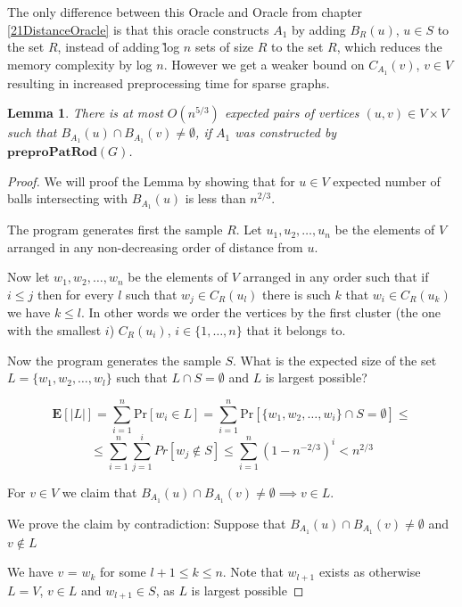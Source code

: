 \documentclass[shortabstract, lic, english]{iithesis}
\theoremstyle{definition} \newtheorem{definition}{Definition}[chapter]
\theoremstyle{remark} \newtheorem{remark}[definition]{Observation}
\theoremstyle{plain} \newtheorem{theorem}[definition]{Theorem}
\theoremstyle{plain} \newtheorem{lemma}[definition]{Lemma}
\theoremstyle{plain} \newtheorem{conjecture}[definition]{Conjecture}
\begin{document}
The only difference between this Oracle and Oracle from chapter \ref{21DistanceOracle} is that this oracle
constructs $A_1$ by adding $B_R(u)$, $u \in S$ to the set $R$, instead of adding \~log $n$ sets of size $R$ to the set $R$, which reduces the memory complexity by log $n$.
However we get a weaker bound on $C_{A_1}(v)$, $v \in V$ resulting in increased preprocessing time for sparse graphs.

\begin{lemma} \label{patRodBallIntersections}
    There is at most $O(n^{5/3})$ expected pairs of vertices $(u, v) \in V \times V$
    such that $B_{A_1}(u) \cap B_{A_1}(v) \neq \emptyset$,
    if $A_1$ was constructed by $\mathbf{preproPatRod}(G)$.
\end{lemma}

\begin{proof}
    We will proof the Lemma by showing that for $u \in V$ expected number of balls intersecting with $B_{A_1}(u)$ is less than $n^{2/3}$.

    The program generates first the sample $R$.
    Let $u_1, u_2, \ldots, u_n$ be the elements of $V$ arranged in any non-decreasing order of distance from $u$.

    Now let $w_1, w_2, \ldots, w_n$ be the elements of $V$ arranged in any order such that if $i \leq j$ then 
    for every $l$ such that $w_j \in C_R(u_l)$ there is such $k$ that $w_i \in C_R(u_k)$ we have $k \leq l$.
    In other words we order the vertices by the first cluster (the one with the smallest $i$) $C_R(u_i)$, $i \in \{1, \ldots, n\}$ that it belongs to.

    Now the program generates the sample $S$. What is the expected size of the set $L = \{w_1, w_2, \ldots, w_l\}$ such that $L \cap S = \emptyset$ and $L$ is largest possible?

    $$\mathbf{E}[|L|] = \sum_{i=1}^{n} \text{Pr}[w_i \in L] =\sum_{i=1}^{n} \text{Pr}[\{w_1, w_2, \ldots, w_i\} \cap S = \emptyset] \leq $$
    $$\leq \sum_{i=1}^{n} \sum_{j=1}^{i} Pr[w_j \notin S] \leq \sum_{i=1}^{n} (1 - n^{-2/3})^i < n^{2/3}$$

    For $v \in V$ we claim that $B_{A_1}(u) \cap B_{A_1}(v) \neq \emptyset \implies v \in L$.

    We prove the claim by contradiction: Suppose that $B_{A_1}(u) \cap B_{A_1}(v) \neq \emptyset$ and $v \notin L$

    We have $v$ = $w_k$ for some $l + 1 \leq k \leq n$. 
    Note that $w_{l+1}$ exists as otherwise $L = V$, $v \in L$ and $w_{l+1} \in S$, as $L$ is largest possible 
    

\end{proof}
\end{document}
